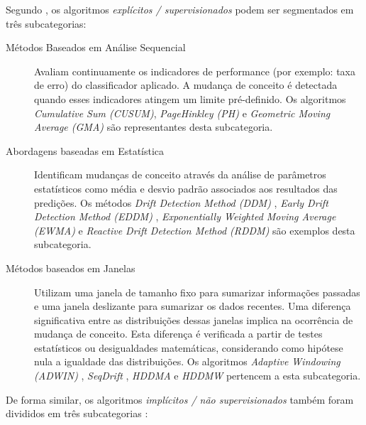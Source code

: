 \documentclass[qual, classic, a4paper]{ufbathesis}
\begin{document}
Segundo , os algoritmos \textit{explícitos / supervisionados} podem ser segmentados em três subcategorias:

\begin{description}
    \item[Métodos Baseados em Análise Sequencial] Avaliam continuamente os indicadores de performance (por exemplo: taxa de erro) do classificador aplicado.
    A mudança de conceito é detectada quando esses indicadores atingem um limite pré-definido.
    Os algoritmos \textit{Cumulative Sum (CUSUM)}, \textit{PageHinkley (PH)} \cite{Page:CUSUM:PageHinkley:1954} e \textit{Geometric Moving Average (GMA)} \cite{Roberts:2000:CCT:338441.338464}
    são representantes desta subcategoria.

    \item[Abordagens baseadas em Estatística] Identificam mudanças de conceito através da análise de parâmetros estatísticos como média e desvio padrão associados aos resultados das predições.
    Os métodos \textit{Drift Detection Method (DDM)} \cite{GamaMCR04}, 
    \textit{Early Drift Detection Method (EDDM)} \cite{EDDM}, 
    \textit{Exponentially Weighted Moving Average (EWMA)} \cite{Ross:2012:EWM:2076039.2076307} e 
    \textit{Reactive Drift Detection Method (RDDM)} \cite{Barros:RDDM:2017} são exemplos desta subcategoria.

    \item[Métodos baseados em Janelas] Utilizam uma janela de tamanho fixo para sumarizar informações passadas e uma janela deslizante para sumarizar os dados recentes.
    Uma diferença significativa entre as distribuições dessas janelas implica na ocorrência de mudança de conceito.
    Esta diferença é verificada a partir de testes estatísticos ou desigualdades matemáticas, considerando como hipótese nula a igualdade das distribuições.
    Os algoritmos 
    \textit{Adaptive Windowing (ADWIN)} \cite{BifetG07}, 
    \textit{SeqDrift} \cite{PearsSK14:SeqDrift:2014}, 
    \textit{HDDMA} e \textit{HDDMW} \cite{BlancoCRBDM15:HDDMA:HDDMW:2015}
    pertencem a esta subcategoria.
\end{description}

De forma similar, os algoritmos \textit{implícitos / não supervisionados} também foram divididos em três subcategorias \cite{GONCALVES20148144}:
\end{document}
